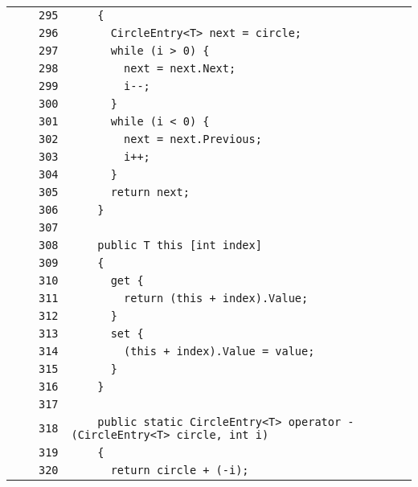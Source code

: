 \documentclass[a4paper,10pt]{article}
\begin{document}
\begin{longtable}[l]{lrrl}
\cellcolor{gray} &  & \verb~295~ & \verb~    {~\\
\cellcolor{gray} &  & \verb~296~ & \verb~      CircleEntry<T> next = circle;~\\
\cellcolor{gray} &  & \verb~297~ & \verb~      while (i > 0) {~\\
\cellcolor{gray} &  & \verb~298~ & \verb~        next = next.Next;~\\
\cellcolor{gray} &  & \verb~299~ & \verb~        i--;~\\
\cellcolor{gray} &  & \verb~300~ & \verb~      }~\\
\cellcolor{gray} &  & \verb~301~ & \verb~      while (i < 0) {~\\
\cellcolor{gray} &  & \verb~302~ & \verb~        next = next.Previous;~\\
\cellcolor{gray} &  & \verb~303~ & \verb~        i++;~\\
\cellcolor{gray} &  & \verb~304~ & \verb~      }~\\
\cellcolor{gray} &  & \verb~305~ & \verb~      return next;~\\
\cellcolor{gray} &  & \verb~306~ & \verb~    }~\\
\cellcolor{gray} &  & \verb~307~ & \verb~~\\
\cellcolor{gray} &  & \verb~308~ & \verb~    public T this [int index]~\\
\cellcolor{gray} &  & \verb~309~ & \verb~    {~\\
\cellcolor{gray} &  & \verb~310~ & \verb~      get {~\\
\cellcolor{gray} &  & \verb~311~ & \verb~        return (this + index).Value;~\\
\cellcolor{gray} &  & \verb~312~ & \verb~      }~\\
\cellcolor{gray} &  & \verb~313~ & \verb~      set {~\\
\cellcolor{gray} &  & \verb~314~ & \verb~        (this + index).Value = value;~\\
\cellcolor{gray} &  & \verb~315~ & \verb~      }~\\
\cellcolor{gray} &  & \verb~316~ & \verb~    }~\\
\cellcolor{gray} &  & \verb~317~ & \verb~~\\
\cellcolor{gray} &  & \verb~318~ & \verb~    public static CircleEntry<T> operator - (CircleEntry<T> circle, int i)~\\
\cellcolor{gray} &  & \verb~319~ & \verb~    {~\\
\cellcolor{gray} &  & \verb~320~ & \verb~      return circle + (-i);~\\

\end{longtable}
\end{document}
